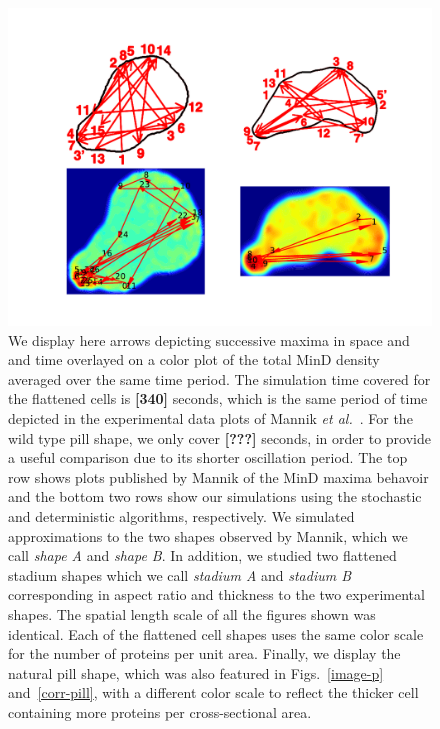 \documentclass[letterpaper,twocolumn,amsmath,amssymb,pre]{revtex4-1}
\newcommand{\red}[1]{{\bf \color{red} #1}}
\newcommand{\fixme}[1]{\red{[#1]}}
\begin{document}
\begin{figure}
  \centering
  \includegraphics[width=\textwidth]{../paper/plot-ave}
  \caption{We display here arrows depicting successive maxima in space
    and and time overlayed on a color plot of the total MinD density
    averaged over the same time period.  The simulation time covered
    for the flattened cells is \fixme{340} seconds, which is the same
    period of time depicted in the experimental data plots of Mannik
    \emph{et al.}~\cite{mannik2012robustness}.  For the wild type pill
    shape, we only cover \fixme{???} seconds, in order to provide a
    useful comparison due to its shorter oscillation period.  The top
    row shows plots published by Mannik of the MinD maxima behavoir
    and the bottom two rows show our simulations using the stochastic
    and deterministic algorithms, respectively.  We simulated
    approximations to the two shapes observed by Mannik, which we call
    \emph{shape A} and \emph{shape B}.  In addition, we studied two
    flattened stadium shapes which we call \emph{stadium A} and
    \emph{stadium B} corresponding in aspect ratio and thickness to
    the two experimental shapes.  The spatial length scale of all the
    figures shown was identical. Each of the flattened cell shapes
    uses the same color scale for the number of proteins per unit
    area.  Finally, we display the natural pill shape, which was also
    featured in Figs.~\ref{image-p} and~\ref{corr-pill}, with a
    different color scale to reflect the thicker cell containing more
    proteins per cross-sectional area.  }
  \label{randst-plot-ave}
\end{figure}
\end{document}
